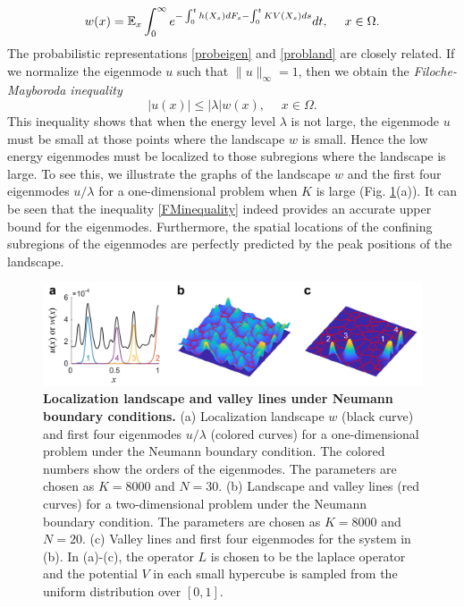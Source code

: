 \documentclass[a4paper,11pt]{article}
\begin{document}
\begin{equation}\label{probland}
w(x) = \mathbb{E}_x \int_{0}^{\infty} e^{- \int_{0}^{t} h(X_s) d F_s - \int_{0}^{t} KV(X_s) ds} dt, \quad \; x \in \Omega.
\end{equation}
The probabilistic representations \eqref{probeigen} and \eqref{probland} are closely related. If we normalize the eigenmode $u$ such that $\|u\|_\infty = 1$, then we obtain the \emph{Filoche-Mayboroda inequality}
\begin{equation}\label{FMinequality}
|u(x)| \leq |\lambda| w(x), \quad \; x \in \Omega.
\end{equation}
This inequality shows that when the energy level $\lambda$ is not large, the eigenmode $u$ must be small at those points where the landscape $w$ is small. Hence the low energy eigenmodes must be localized to those subregions where the landscape is large. To see this, we illustrate the graphs of the landscape $w$ and the first four eigenmodes $u/\lambda$ for a one-dimensional problem when $K$ is large (Fig. \ref{fig1}(a)). It can be seen that the inequality \eqref{FMinequality} indeed provides an accurate upper bound for the eigenmodes. Furthermore, the spatial locations of the confining subregions of the eigenmodes are perfectly predicted by the peak positions of the landscape.
\begin{figure}
\centering\includegraphics[width=\linewidth]{Fig1}
\caption{\textbf{Localization landscape and valley lines under Neumann boundary conditions.} (a) Localization landscape $w$ (black curve) and first four eigenmodes $u/\lambda$ (colored curves) for a one-dimensional problem under the Neumann boundary condition. The colored numbers show the orders of the eigenmodes. The parameters are chosen as $K = 8000$ and $N = 30$. (b) Landscape and valley lines (red curves) for a two-dimensional problem under the Neumann boundary condition. The parameters are chosen as $K = 8000$ and $N = 20$. (c) Valley lines and first four eigenmodes for the system in (b). In (a)-(c), the operator $L$ is chosen to be the laplace operator and the potential $V$ in each small hypercube is sampled from the uniform distribution over $[0,1]$. }
\label{fig1}
\end{figure}
\end{document}
